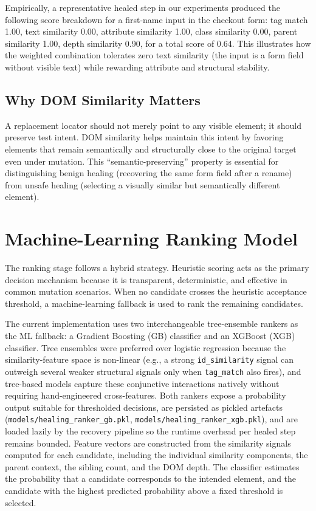 \documentclass[conference]{IEEEtran}
\begin{document}
Empirically, a representative healed step in our experiments produced the following score breakdown for a first-name input in the checkout form: tag match 1.00, text similarity 0.00, attribute similarity 1.00, class similarity 0.00, parent similarity 1.00, depth similarity 0.90, for a total score of 0.64. This illustrates how the weighted combination tolerates zero text similarity (the input is a form field without visible text) while rewarding attribute and structural stability.

\subsection{Why DOM Similarity Matters}
A replacement locator should not merely point to any visible element; it should preserve test intent. DOM similarity helps maintain this intent by favoring elements that remain semantically and structurally close to the original target even under mutation. This ``semantic-preserving'' property is essential for distinguishing benign healing (recovering the same form field after a rename) from unsafe healing (selecting a visually similar but semantically different element).

\section{Machine-Learning Ranking Model}
\label{sec:ranking}
The ranking stage follows a hybrid strategy. Heuristic scoring acts as the primary decision mechanism because it is transparent, deterministic, and effective in common mutation scenarios. When no candidate crosses the heuristic acceptance threshold, a machine-learning fallback is used to rank the remaining candidates.

The current implementation uses two interchangeable tree-ensemble rankers as the ML fallback: a Gradient Boosting (GB) classifier and an XGBoost (XGB) classifier. Tree ensembles were preferred over logistic regression because the similarity-feature space is non-linear (e.g., a strong \texttt{id\_similarity} signal can outweigh several weaker structural signals only when \texttt{tag\_match} also fires), and tree-based models capture these conjunctive interactions natively without requiring hand-engineered cross-features. Both rankers expose a probability output suitable for thresholded decisions, are persisted as pickled artefacts (\texttt{models/healing\_ranker\_gb.pkl}, \texttt{models/healing\_ranker\_xgb.pkl}), and are loaded lazily by the recovery pipeline so the runtime overhead per healed step remains bounded. Feature vectors are constructed from the similarity signals computed for each candidate, including the individual similarity components, the parent context, the sibling count, and the DOM depth. The classifier estimates the probability that a candidate corresponds to the intended element, and the candidate with the highest predicted probability above a fixed threshold is selected.
\end{document}
